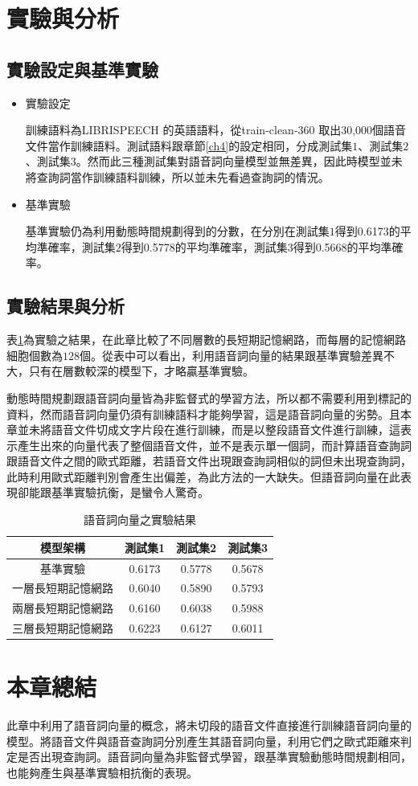 \section{實驗與分析}
\subsection{實驗設定與基準實驗}
\begin{itemize}
\item{實驗設定}

訓練語料為LIBRISPEECH 的英語語料，從train-clean-360
取出30,000個語音文件當作訓練語料。測試語料跟章節\ref{ch4}的設定相同，分成測試集$1$、測試集$2$、測試集$3$。然而此三種測試集對語音詞向量模型並無差異，因此時模型並未將查詢詞當作訓練語料訓練，所以並未先看過查詢詞的情況。
\item{基準實驗}

基準實驗仍為利用動態時間規劃得到的分數，在分別在測試集$1$得到0.6173的平均準確率，測試集$2$得到0.5778的平均準確率，測試集$3$得到0.5668的平均準確率。
\end{itemize}
\subsection{實驗結果與分析}
表\ref{table:ch5_a2v}為實驗之結果，在此章比較了不同層數的長短期記憶網路，而每層的記憶網路細胞個數為$128$個。從表中可以看出，利用語音詞向量的結果跟基準實驗差異不大，只有在層數較深的模型下，才略贏基準實驗。

動態時間規劃跟語音詞向量皆為非監督式的學習方法，所以都不需要利用到標記的資料，然而語音詞向量仍須有訓練語料才能夠學習，這是語音詞向量的劣勢。且本章並未將語音文件切成文字片段在進行訓練，而是以整段語音文件進行訓練，這表示產生出來的向量代表了整個語音文件，並不是表示單一個詞，而計算語音查詢詞跟語音文件之間的歐式距離，若語音文件出現跟查詢詞相似的詞但未出現查詢詞，此時利用歐式距離判別會產生出偏差，為此方法的一大缺失。但語音詞向量在此表現卻能跟基準實驗抗衡，是蠻令人驚奇。

\begin{table}[ht]
	 \centering
	 \caption{語音詞向量之實驗結果}
	 \label{table:ch5_a2v}
	 \begin{tabular}{|c|c|c|c|}
		 \hline
		 模型架構 & 測試集1 & 測試集2 & 測試集3 \\
		 \hline
		 基準實驗 & 0.6173 & 0.5778 & 0.5678\\
		 \hline
		 一層長短期記憶網路& 0.6040 & 0.5890 & 0.5793 \\
		 \hline
		 兩層長短期記憶網路& 0.6160 &0.6038 &0.5988\\
		 \hline
		 三層長短期記憶網路& {\color{red}0.6223} &0.6127 &0.6011\\
		 \hline
	   \end{tabular}
\end{table}






\section{本章總結}
此章中利用了語音詞向量的概念，將未切段的語音文件直接進行訓練語音詞向量的模型。將語音文件與語音查詢詞分別產生其語音詞向量，利用它們之歐式距離來判定是否出現查詢詞。語音詞向量為非監督式學習，跟基準實驗動態時間規劃相同，也能夠產生與基準實驗相抗衡的表現。
